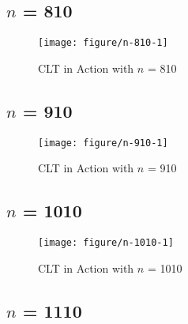 \documentclass[11pt,letter]{article}\usepackage[]{graphicx}\usepackage[]{color}
\makeatletter
\def\maxwidth{ %
  \ifdim\Gin@nat@width>\linewidth
    \linewidth
  \else
    \Gin@nat@width
  \fi
}
\newenvironment{knitrout}{}{} %
\makeatother
\begin{document}
\subsection{$n$ = 810}

\begin{knitrout}
\color{fgcolor}\begin{figure}[h]

{\centering \texttt{[image: figure/n-810-1]} 

}

\caption[CLT in Action with $n$ = 810]{CLT in Action with $n$ = 810}\label{fig:n-810}
\end{figure}


\end{knitrout}
\newpage
\subsection{$n$ = 910}

\begin{knitrout}
\color{fgcolor}\begin{figure}[h]

{\centering \texttt{[image: figure/n-910-1]} 

}

\caption[CLT in Action with $n$ = 910]{CLT in Action with $n$ = 910}\label{fig:n-910}
\end{figure}


\end{knitrout}
\newpage
\subsection{$n$ = 1010}

\begin{knitrout}
\color{fgcolor}\begin{figure}[h]

{\centering \texttt{[image: figure/n-1010-1]} 

}

\caption[CLT in Action with $n$ = 1010]{CLT in Action with $n$ = 1010}\label{fig:n-1010}
\end{figure}


\end{knitrout}
\newpage
\subsection{$n$ = 1110}
\end{document}

